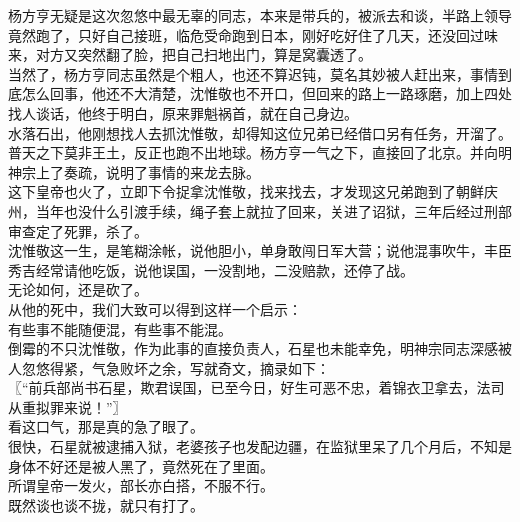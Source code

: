 \begin{multicols}{\theparacolNo}
杨方亨无疑是这次忽悠中最无辜的同志，本来是带兵的，被派去和谈，半路上领导竟然跑了，只好自己接班，临危受命跑到日本，刚好吃好住了几天，还没回过味来，对方又突然翻了脸，把自己扫地出门，算是窝囊透了。\\

当然了，杨方亨同志虽然是个粗人，也还不算迟钝，莫名其妙被人赶出来，事情到底怎么回事，他还不大清楚，沈惟敬也不开口，但回来的路上一路琢磨，加上四处找人谈话，他终于明白，原来罪魁祸首，就在自己身边。\\

水落石出，他刚想找人去抓沈惟敬，却得知这位兄弟已经借口另有任务，开溜了。\\

普天之下莫非王土，反正也跑不出地球。杨方亨一气之下，直接回了北京。并向明神宗上了奏疏，说明了事情的来龙去脉。\\

这下皇帝也火了，立即下令捉拿沈惟敬，找来找去，才发现这兄弟跑到了朝鲜庆州，当年也没什么引渡手续，绳子套上就拉了回来，关进了诏狱，三年后经过刑部审查定了死罪，杀了。\\

沈惟敬这一生，是笔糊涂帐，说他胆小，单身敢闯日军大营；说他混事吹牛，丰臣秀吉经常请他吃饭，说他误国，一没割地，二没赔款，还停了战。\\

无论如何，还是砍了。\\

从他的死中，我们大致可以得到这样一个启示：\\

有些事不能随便混，有些事不能混。\\

倒霉的不只沈惟敬，作为此事的直接负责人，石星也未能幸免，明神宗同志深感被人忽悠得紧，气急败坏之余，写就奇文，摘录如下：\\

〖“前兵部尚书石星，欺君误国，已至今日，好生可恶不忠，着锦衣卫拿去，法司从重拟罪来说！”〗\\

看这口气，那是真的急了眼了。\\

很快，石星就被逮捕入狱，老婆孩子也发配边疆，在监狱里呆了几个月后，不知是身体不好还是被人黑了，竟然死在了里面。\\

所谓皇帝一发火，部长亦白搭，不服不行。\\

既然谈也谈不拢，就只有打了。\\


\end{multicols}
